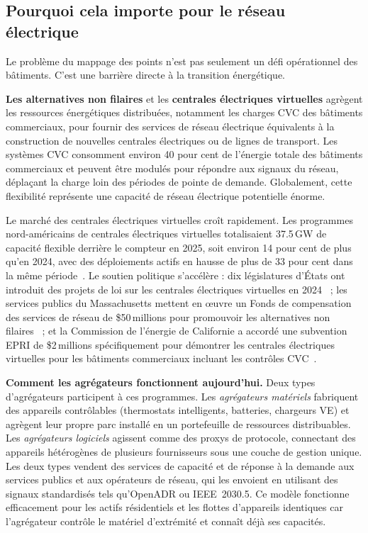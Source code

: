 \subsection{Pourquoi cela importe pour le réseau électrique}
\label{subsec:grid-relevance}

Le problème du mappage des points n'est pas seulement un défi opérationnel des bâtiments.
C'est une barrière directe à la transition énergétique.

\textbf{Les alternatives non filaires} et les \textbf{centrales électriques virtuelles} agrègent les ressources énergétiques
distribuées, notamment les charges CVC des bâtiments commerciaux, pour fournir des services de réseau électrique équivalents à
la construction de nouvelles centrales électriques ou de lignes de transport.
Les systèmes CVC consomment environ 40 pour cent de l'énergie totale des bâtiments commerciaux et peuvent être
modulés pour répondre aux signaux du réseau, déplaçant la charge loin des périodes de pointe de demande.
Globalement, cette flexibilité représente une capacité de réseau électrique potentielle énorme.

Le marché des centrales électriques virtuelles croît rapidement.
Les programmes nord-américains de centrales électriques virtuelles totalisaient 37.5\,GW de capacité flexible derrière le compteur
en 2025, soit environ 14 pour cent de plus qu'en 2024, avec des déploiements actifs en hausse de plus de 33
pour cent dans la même période~\cite{WoodMac2025}.
Le soutien politique s'accélère : dix législatures d'États ont introduit des projets de loi sur les centrales électriques virtuelles en
2024~\cite{RMI_VP3_2025,SEPA_NCCETC2025} ; les services publics du Massachusetts mettent en œuvre un
Fonds de compensation des services de réseau de \$50\,millions pour promouvoir les alternatives non filaires~\cite{RMI_VP3_2025} ;
et la Commission de l'énergie de Californie a accordé une subvention EPRI de \$2\,millions spécifiquement pour démontrer
les centrales électriques virtuelles pour les bâtiments commerciaux incluant les contrôles CVC~\cite{CEC_EPRI2024}.

\textbf{Comment les agrégateurs fonctionnent aujourd'hui.}
Deux types d'agrégateurs participent à ces programmes.
Les \emph{agrégateurs matériels} fabriquent des appareils contrôlables (thermostats intelligents, batteries, chargeurs VE)
et agrègent leur propre parc installé en un portefeuille de ressources distribuables.
Les \emph{agrégateurs logiciels} agissent comme des proxys de protocole, connectant des appareils hétérogènes de
plusieurs fournisseurs sous une couche de gestion unique.
Les deux types vendent des services de capacité et de réponse à la demande aux services publics et aux opérateurs de réseau, qui les envoient
en utilisant des signaux standardisés tels qu'OpenADR ou IEEE~2030.5.
Ce modèle fonctionne efficacement pour les actifs résidentiels et les flottes d'appareils identiques car
l'agrégateur contrôle le matériel d'extrémité et connaît déjà ses capacités.

